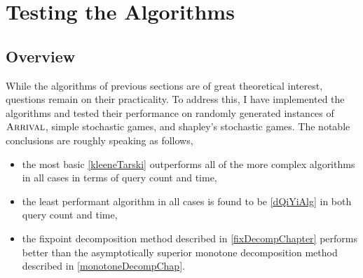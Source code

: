 \chapter{Testing the Algorithms}
\newcommand{\code}[1]{\lstinline|#1|}
\section{Overview}
While the algorithms of previous sections are of great theoretical interest,
questions remain on their practicality. To address this,
I have implemented the algorithms and tested their performance on
randomly generated instances of $\textsc{Arrival}$, simple stochastic games, and
shapley's stochastic games. The notable conclusions are roughly speaking as follows,
\begin{itemize}
  \item the most basic \cref{kleeneTarski} outperforms all of the
more complex algorithms in all cases in terms of query count and time,
\item the least performant algorithm in all cases is found to be \cref{dQiYiAlg} in both
  query count and time,
  \item the fixpoint decomposition method described in \cref{fixDecompChapter} performs better than the asymptotically superior
monotone decomposition method described in \cref{monotoneDecompChap}.
\end{itemize}



